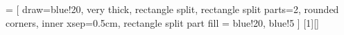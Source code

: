 \newcommand{\red}[1]{{\color{red}#1}}

\usetikzlibrary{shapes.multipart}

 = [
draw=blue!20, very thick,
rectangle split, rectangle split parts=2, rounded corners, inner xsep=0.5cm,
rectangle split part fill = {blue!20, blue!5}
]
[1][]{%

\begin{center}
\end{center}
}
